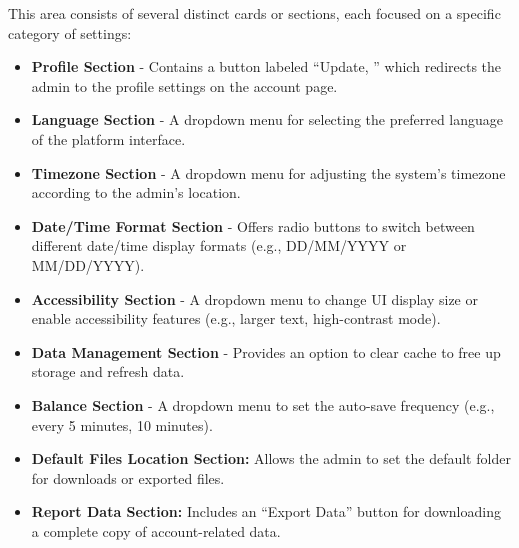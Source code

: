 \documentclass[11pt,a4paper]{article}
\begin{document}
This area consists of several distinct cards or sections, each focused on a specific category of settings:
\begin{itemize}
\item \textbf{Profile Section} - Contains a button labeled ``Update, '' which redirects the admin to the profile settings on the account page.
\item \textbf{Language Section} - A dropdown menu for selecting the preferred language of the platform interface.
\item \textbf{Timezone Section} - A dropdown menu for adjusting the system's timezone according to the admin’s location.
\item \textbf{Date/Time Format Section} - Offers radio buttons to switch between different date/time display formats (e.g., DD/MM/YYYY or MM/DD/YYYY).
\item \textbf{Accessibility Section} - A dropdown menu to change UI display size or enable accessibility features (e.g., larger text, high-contrast mode).
\item \textbf{Data Management Section} - Provides an option to clear cache to free up storage and refresh data.
\item \textbf{Balance Section} - A dropdown menu to set the auto-save frequency (e.g., every 5 minutes, 10 minutes).
\item \textbf{Default Files Location Section:} Allows the admin to set the default folder for downloads or exported files.
\item \textbf{Report Data Section:} Includes an ``Export Data'' button for downloading a complete copy of account-related data.
\end{itemize}


	
\end{document}
